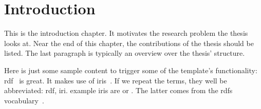 \chapter{Introduction}
\label{ch:introduction}

This is the introduction chapter. It motivates the research problem the thesis looks at. Near the end of this chapter, the contributions of the thesis should be listed. The last paragraph is typically an overview over the thesis' structure.

Here is just some sample content to trigger some of the template's functionality: \gls{rdf}~\cite{rdfprimer} is great. It makes use of \glspl{iri}~\cite{rfc3987}. If we repeat the terms, they well be abbreviated: \gls{rdf}, \gls{iri}. example \glspl{iri} are  or . The latter comes from the \gls{rdfs} vocabulary~\cite{rdfs1.1}.

